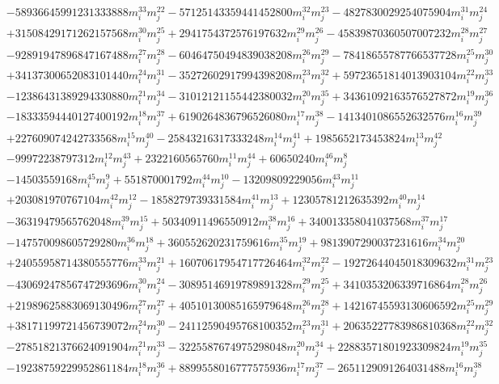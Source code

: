 {\begin{align*}
&-58936645991231333888m_i^{33}m_j^{22}-57125143359441452800m_i^{32}m_j^{23}-4827830029254075904m_i^{31}m_j^{24}\\
&+31508429171262157568m_i^{30}m_j^{25}+2941754372576197632m_i^{29}m_j^{26}-45839870360507007232m_i^{28}m_j^{27}\\
&-92891947896847167488m_i^{27}m_j^{28}-60464750494839038208m_i^{26}m_j^{29}-78418655787766537728m_i^{25}m_j^{30}\\
&+34137300652083101440m_i^{24}m_j^{31}-35272602917994398208m_i^{23}m_j^{32}+59723651814013903104m_i^{22}m_j^{33}\\
&-12386431389294330880m_i^{21}m_j^{34}-31012121155442380032m_i^{20}m_j^{35}+34361092163576527872m_i^{19}m_j^{36}\\
&-18333594440127400192m_i^{18}m_j^{37}+6190264836796526080m_i^{17}m_j^{38}-1413401086552632576m_i^{16}m_j^{39}\\
&+227609074242733568m_i^{15}m_j^{40}-25843216317333248m_i^{14}m_j^{41}+1985652173453824m_i^{13}m_j^{42}\\
&-99972238797312m_i^{12}m_j^{43}+2322160565760m_i^{11}m_j^{44}+60650240m_i^{46}m_j^{8}\\
&-14503559168m_i^{45}m_j^{9}+551870001792m_i^{44}m_j^{10}-13209809229056m_i^{43}m_j^{11}\\
&+203081970767104m_i^{42}m_j^{12}-1858279739331584m_i^{41}m_j^{13}+12305781212635392m_i^{40}m_j^{14}\\
&-36319479565762048m_i^{39}m_j^{15}+50340911496550912m_i^{38}m_j^{16}+340013358041037568m_i^{37}m_j^{17}\\
&-147570098605729280m_i^{36}m_j^{18}+360552620231759616m_i^{35}m_j^{19}+9813907290037231616m_i^{34}m_j^{20}\\
&+24055958714380555776m_i^{33}m_j^{21}+16070617954717726464m_i^{32}m_j^{22}-19272644045018309632m_i^{31}m_j^{23}\\
&-43069247856747293696m_i^{30}m_j^{24}-30895146919789891328m_i^{29}m_j^{25}+3410353206339716864m_i^{28}m_j^{26}\\
&+21989625883069130496m_i^{27}m_j^{27}+40510130085165979648m_i^{26}m_j^{28}+14216745593130606592m_i^{25}m_j^{29}\\
&+38171199721456739072m_i^{24}m_j^{30}-24112590495768100352m_i^{23}m_j^{31}+20635227783986810368m_i^{22}m_j^{32}\\
&-27851821376624091904m_i^{21}m_j^{33}-3225587674975298048m_i^{20}m_j^{34}+22883571801923309824m_i^{19}m_j^{35}\\
&-19238759229952861184m_i^{18}m_j^{36}+8899558016777575936m_i^{17}m_j^{37}-2651129091264031488m_i^{16}m_j^{38}\\

\end{align*}}
